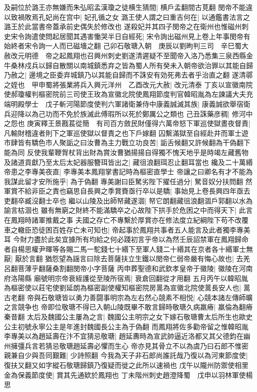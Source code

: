 及嗣位於潞王亦無嫌而朱弘昭孟漢瓊之徒横生猜間|{
	横戶孟翻間古莧翻}
閔帝不能違以致禍敗焉孔妃尚在宫中|{
	妃孔循之女}
潞王使人謂之曰重吉何在|{
	以通鑑書法言之潞王於此當書帝蓋承前史偶失於修改也}
遂殺妃并其四子閔帝之在衛州也惟磁州刺史宋令詢遣使問起居聞其遇害慟哭半日自經死|{
	宋令詢出磁州見上卷上年事閔帝有始終者宋令詢一人而已磁墻之翻}
己卯石敬瑭入朝　庚辰以劉昫判三司　辛巳蜀大赦改元明德　帝之起鳳翔也召興州刺史劉遂清遲疑不至聞帝入洛乃悉集三泉西縣金牛桑林戍兵以歸自散關以南城鎮悉弃之皆為蜀人所有癸未入朝帝欲治罪以其能自歸乃赦之|{
	邊境之臣委弃城鎮乃以其能自歸而不誅安有効死弗去者乎治直之翻}
遂清鄩之姪也　甲申蜀將張業將兵入興元洋州　乙酉改元大赦|{
	改元清泰}
丁亥以宣徽南院使郝瓊權判樞密院前三司使王玫為宣徽北院使鳳翔節度判官韓昭胤為左諫議大夫充端明殿學士　戊子斬河陽節度使判六軍諸衛兼侍中康義誠滅其族|{
	康義誠欲舉宿衛兵迎降以為己功而不免於族滅此傅瑕所以死於鄭厲公之類也}
己丑誅藥彦稠|{
	修河中之怨也}
庚寅釋王景戡萇從簡　有司百方斂民財僅得六萬帝怒下軍巡使獄晝夜督責|{
	凡輸財稽違者則下之軍巡使獄以督責之也下戶嫁翻}
囚繫滿獄至自經赴井而軍士遊市肆皆有驕色市人聚詬之曰汝曹為主力戰立功良苦|{
	詬舌候翻又許候翻為干偽翻下能為同}
反使我輩鞭胷杖背出財為賞汝曹猶揚揚自得獨不愧天地乎是時竭左藏舊物及諸道貢獻乃至太后太妃器服簪珥皆出之|{
	藏徂浪翻珥忍止翻耳當也}
纔及二十萬緡帝患之李專美夜直|{
	李專美本鳳翔掌書記時為樞密直學士}
帝讓之曰卿名有才不能為我謀此留才安所施乎|{
	為于偽翻}
專美謝曰臣駑劣陛下擢任過分|{
	駑音奴分扶問翻}
然軍賞不給非臣之責也竊思自長興之季賞賚亟行卒以是驕|{
	事始見上卷長興四年亟去吏翻卒臧沒翻士卒也}
繼以山陵及出師帑藏遂涸|{
	帑它朗翻藏徂浪翻涸戶郭翻以水為諭言枯涸也}
雖有無窮之財終不能滿驕卒之心故陛下拱手於危困之中而得天下|{
	此言在鳳翔時諸軍推戴之事}
夫國之存亡不專繫於厚賞亦在修法度立紀綱陛下苟不改覆車之轍臣恐徒困百姓存亡未可知也|{
	帝起事於鳳翔共事者五人能言及此者獨李專美耳}
今財力盡於此矣宜據所有均給之何必踐初言乎帝以為然壬辰詔禁軍在鳳翔歸命者自楊思權尹暉等各賜二馬一駝錢七十緡下至軍人錢二十緡其在京者各十緡軍士無厭|{
	厭於言翻}
猶怨望為謡言曰除去菩薩扶立生鐵以閔帝仁弱帝嚴有悔心故也|{
	去羌呂翻菩薄乎翻薩桑割翻閔帝小字菩薩}
丙申葬聖德和武欽孝皇帝于徽陵|{
	徽陵在河南府洛陽縣}
廟號明宗帝衰絰護從至陵所宿焉|{
	衰倉回翻從才用翻}
五月丙午以韓昭胤為樞密使以莊宅使劉延朗為樞密副使權知樞密院房暠為宣徽北院使暠長安人也|{
	暠古老翻}
帝與石敬瑭皆以勇力善闘事明宗為左右然心競素不相悦|{
	心競本諸左傳師曠之言競争也}
帝即位敬瑭不得已入朝山陵既畢不敢言歸時敬瑭久病羸瘠|{
	羸倫為翻瘠秦昔翻}
太后及魏國公主屢為之言|{
	魏國公主明宗之女下嫁石敬瑭曹太后所生也歐史公主初號永寧公主是年進封魏國長公主為于偽翻}
而鳳翔將佐多勸帝留之惟韓昭胤李專美以為趙延壽在汴不宜猜忌敬瑭|{
	趙延夀時為宣武帥逼近洛都又其父德鈞在幽州擁彊兵言若猜忌敬瑭趙延壽必懼而生心}
帝亦見其骨立不以為虞乃曰石郎不惟密親兼自少與吾同艱難|{
	少詩照翻}
今我為天子非石郎尚誰託哉乃復以為河東節度使|{
	復扶又翻又如字縱石敬瑭歸鎮乃復疑而徙之此所以速禍也}
戊午以隴州防禦使相里金為保義節度使|{
	賞其先通欵於鳳翔也}
丁未階州刺史趙澄降蜀　戊申以羽林軍使楊思

